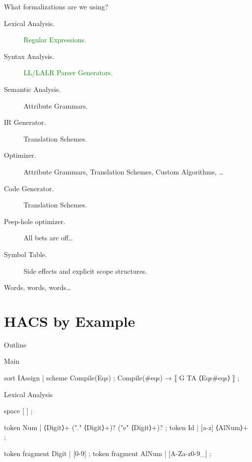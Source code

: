 \documentclass[pdftex,aspectratio=169,14pt]{beamer}
\def\t#1{\texttt{#1}}
\begin{document}
\begin{frame}{What formalizations are we using?}
  \begin{description}
  \item[Lexical Analysis.] \textcolor{green}{Regular Expressions.}\pause
  \item[Syntax Analysis.] \textcolor{green}{LL/LALR Parser Generators.}\pause
  \item[Semantic Analysis.] \alert{Attribute Grammars.}\pause
  \item[IR Generator.] \alert{Translation Schemes.}\pause
  \item[Optimizer.] \alert{Attribute Grammars, Translation Schemes, Custom Algorithms, \dots}\pause
  \item[Code Generator.] \alert{Translation Schemes.}\pause
  \item[Peep-hole optimizer.] \alert{All bets are off\dots}\pause\\[1em]

  \item[Symbol Table.] \alert{Side effects and explicit scope structures.}
  \end{description}
\end{frame}

\begin{frame}{Words, words, words…}
  \begin{center}
  \end{center}
\end{frame}


\section{HACS by Example}
\begin{frame}{Outline}
  \tableofcontents[current]
\end{frame}

\begin{frame}[fragile]{Main}
\begin{hacs}
sort IAssign   | scheme Compile(Eqs) ;
Compile(#eqs) →  ⟦ G TA ⟨Eqs#eqs⟩ ⟧ ;
\end{hacs}
\end{frame}

\begin{frame}[fragile]{Lexical Analysis}
\begin{hacs}
space [ \t\n] ;

token Num  | ⟨Digit⟩+ ("." ⟨Digit⟩+)? ("e" ⟨Digit⟩+)? ;
token Id   | [a-z] ⟨AlNum⟩+ ;

token fragment Digit  | [0-9] ;
token fragment AlNum  | [A-Za-z0-9_] ;
\end{hacs}
\end{frame}
\end{document}
